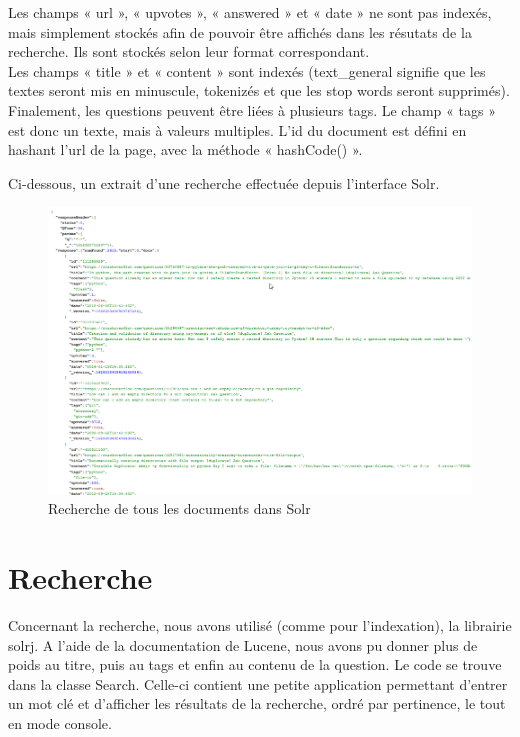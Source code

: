 \documentclass[a4paper]{article}
\begin{document}
	Les champs « url », « upvotes », « answered » et « date » ne sont pas indexés,
	mais simplement stockés afin de pouvoir être affichés dans les résutats de la recherche.
	Ils sont stockés selon leur format correspondant. \\
	Les champs « title » et « content » sont indexés (text\_general signifie que les textes seront mis en minuscule, tokenizés et que les stop words seront supprimés). \\
	Finalement, les questions peuvent être liées à plusieurs tags. Le champ « tags » est donc un texte, mais à valeurs multiples.
	L'id du document est défini en hashant l'url de la page, avec la méthode « hashCode() ».
	
	Ci-dessous, un extrait d'une recherche effectuée depuis l'interface Solr.

	\begin{figure}[H]
		\centering
		\includegraphics[width=\columnwidth]{images/02-solr-content.png}
		\caption{Recherche de tous les documents dans Solr}
	\end{figure}

	\section{Recherche}
	Concernant la recherche, nous avons utilisé (comme pour l'indexation),
	la librairie solrj. A l'aide de la documentation de Lucene,
	nous avons pu donner plus de poids au titre, puis au tags et enfin au contenu de la question.
	Le code se trouve dans la classe Search. Celle-ci contient une petite application permettant d'entrer un mot clé et d'afficher les résultats de la recherche,
	ordré par pertinence, le tout en mode console.
	
\end{document}
